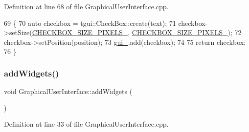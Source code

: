 Definition at line 68 of file Graphical\+User\+Interface.\+cpp.


\begin{DoxyCode}
69                                                                                            \{
70     \textcolor{keyword}{auto} checkbox = tgui::CheckBox::create(text);
71     checkbox->setSize(\hyperlink{classGraphicalUserInterface_afe4127bf0dbfbba90ec15fea6e046379}{CHECKBOX\_SIZE\_PIXELS\_}, 
      \hyperlink{classGraphicalUserInterface_afe4127bf0dbfbba90ec15fea6e046379}{CHECKBOX\_SIZE\_PIXELS\_});
72     checkbox->setPosition(position);
73     \hyperlink{classGraphicalUserInterface_ab07abda0fdb8e2965b70d2024fa3cf20}{gui\_}.add(checkbox);
74 
75     \textcolor{keywordflow}{return} checkbox;
76 \}
\end{DoxyCode}
\mbox{\label{classGraphicalUserInterface_a48e6dcc9acc179fdb74e67a51d66efb7}} 
\subsubsection{\texorpdfstring{add\+Widgets()}{addWidgets()}}
{\footnotesize\ttfamily void Graphical\+User\+Interface\+::add\+Widgets (\begin{DoxyParamCaption}{ }\end{DoxyParamCaption})}



Definition at line 33 of file Graphical\+User\+Interface.\+cpp.


